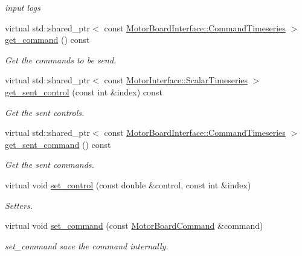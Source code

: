 \begin{DoxyCompactItemize}
\begin{DoxyCompactList}\small\item\em input logs \end{DoxyCompactList}\item 
virtual std\+::shared\+\_\+ptr$<$ const \hyperlink{classblmc__drivers_1_1MotorBoardInterface_ae2afe94a023d9f08a4c689e9b7660f15}{Motor\+Board\+Interface\+::\+Command\+Timeseries} $>$ \hyperlink{classblmc__drivers_1_1SpiMotorBoard_ad8640595ac4c46af1847fd141946d640}{get\+\_\+command} () const
\begin{DoxyCompactList}\small\item\em Get the commands to be send. \end{DoxyCompactList}\item 
virtual std\+::shared\+\_\+ptr$<$ const \hyperlink{classblmc__drivers_1_1MotorInterface_a49b8fc916b9f9debbd7b0988463db5cd}{Motor\+Interface\+::\+Scalar\+Timeseries} $>$ \hyperlink{classblmc__drivers_1_1SpiMotorBoard_af6e2b210a6746b82a01aa2f2b550d05d}{get\+\_\+sent\+\_\+control} (const int \&index) const
\begin{DoxyCompactList}\small\item\em Get the sent controls. \end{DoxyCompactList}\item 
virtual std\+::shared\+\_\+ptr$<$ const \hyperlink{classblmc__drivers_1_1MotorBoardInterface_ae2afe94a023d9f08a4c689e9b7660f15}{Motor\+Board\+Interface\+::\+Command\+Timeseries} $>$ \hyperlink{classblmc__drivers_1_1SpiMotorBoard_a4efe6ae858714de5cf5e54346fb6493c}{get\+\_\+sent\+\_\+command} () const
\begin{DoxyCompactList}\small\item\em Get the sent commands. \end{DoxyCompactList}\item 
virtual void \hyperlink{classblmc__drivers_1_1SpiMotorBoard_ae11c5382665adfa718bcc43ec1e84b6e}{set\+\_\+control} (const double \&control, const int \&index)
\begin{DoxyCompactList}\small\item\em Setters. \end{DoxyCompactList}\item 
virtual void \hyperlink{classblmc__drivers_1_1SpiMotorBoard_a6b626225af993444bdee397952281772}{set\+\_\+command} (const \hyperlink{classblmc__drivers_1_1MotorBoardCommand}{Motor\+Board\+Command} \&command)
\begin{DoxyCompactList}\small\item\em set\+\_\+command save the command internally. \end{DoxyCompactList}\item 

\end{DoxyCompactItemize}
